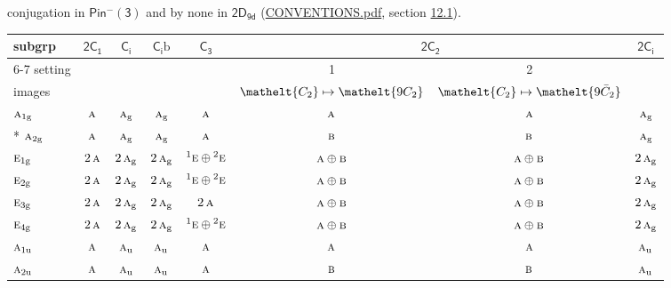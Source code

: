 \documentclass[10pt,a4paper]{article}
\numberwithin{equation}{section}
\newcommand{\eltfont}[1]{{\let\sigma\eltsigma\mathelt{#1}}}
\newcommand{\grp}[1]{\mathsf{#1}}
\newcommand{\irr}[1]{\text{\normalfont\scshape #1}}
\newcommand{\conjpair}[1]{{}^{#1}}
\newcommand{\cls}[1]{\eltfont{#1}}
\newcommand{\ptag}[1]{\mathrm{#1}}
\newcommand{\barred}[1]{\bar{#1}}
\newcommand{\secondclass}{\mathrm{b}}
\begin{document}
conjugation in \href{Pinminus3.pdf}{$\grp{Pin^{-}(3)}$} and by none in $\grp{2D_{9d}}$ (\href{../../CONVENTIONS.pdf}{CONVENTIONS.pdf}, section \href{../../../rotation/CONVENTIONS.pdf\#conv.12.1}{12.1}).
{\small\begin{longtable}{@{}lccccccc@{}}\toprule
subgrp & \href{2C1.pdf}{$\grp{2C_{1}}$} & \href{S2.pdf}{$\grp{C_{i}}$} & \href{S2b.pdf}{$\grp{C_{i}}\secondclass$} & \href{C3.pdf}{$\grp{C_{3}}$} & \multicolumn{2}{c}{\href{2C2.pdf}{$\grp{2C_{2}}$}} & \href{2S2.pdf}{$\grp{2C_{i}}$}\\\cmidrule(lr){6-7}
setting &  &  &  &  & 1 & 2 & \\
images &  &  &  &  & {\scriptsize $\cls{C_{2}} \mapsto \cls{9C_{2}}$} & {\scriptsize $\cls{C_{2}} \mapsto \cls{9\barred{C}_{2}}$} & \\\midrule\endhead
\bottomrule\endfoot\endlastfoot
$\irr{a}_{1\ptag{g}}$ & $\irr{a}$ & $\irr{a}_{\ptag{g}}$ & $\irr{a}_{\ptag{g}}$ & $\irr{a}$ & $\irr{a}$ & $\irr{a}$ & $\irr{a}_{\ptag{g}}$\\*
$\irr{a}_{2\ptag{g}}$ & $\irr{a}$ & $\irr{a}_{\ptag{g}}$ & $\irr{a}_{\ptag{g}}$ & $\irr{a}$ & $\irr{b}$ & $\irr{b}$ & $\irr{a}_{\ptag{g}}$\\
$\irr{e}_{1\ptag{g}}$ & $2\,\irr{a}$ & $2\,\irr{a}_{\ptag{g}}$ & $2\,\irr{a}_{\ptag{g}}$ & $\conjpair{1}\irr{e}\oplus \conjpair{2}\irr{e}$ & $\irr{a}\oplus \irr{b}$ & $\irr{a}\oplus \irr{b}$ & $2\,\irr{a}_{\ptag{g}}$\\
$\irr{e}_{2\ptag{g}}$ & $2\,\irr{a}$ & $2\,\irr{a}_{\ptag{g}}$ & $2\,\irr{a}_{\ptag{g}}$ & $\conjpair{1}\irr{e}\oplus \conjpair{2}\irr{e}$ & $\irr{a}\oplus \irr{b}$ & $\irr{a}\oplus \irr{b}$ & $2\,\irr{a}_{\ptag{g}}$\\
$\irr{e}_{3\ptag{g}}$ & $2\,\irr{a}$ & $2\,\irr{a}_{\ptag{g}}$ & $2\,\irr{a}_{\ptag{g}}$ & $2\,\irr{a}$ & $\irr{a}\oplus \irr{b}$ & $\irr{a}\oplus \irr{b}$ & $2\,\irr{a}_{\ptag{g}}$\\
$\irr{e}_{4\ptag{g}}$ & $2\,\irr{a}$ & $2\,\irr{a}_{\ptag{g}}$ & $2\,\irr{a}_{\ptag{g}}$ & $\conjpair{1}\irr{e}\oplus \conjpair{2}\irr{e}$ & $\irr{a}\oplus \irr{b}$ & $\irr{a}\oplus \irr{b}$ & $2\,\irr{a}_{\ptag{g}}$\\
$\irr{a}_{1\ptag{u}}$ & $\irr{a}$ & $\irr{a}_{\ptag{u}}$ & $\irr{a}_{\ptag{u}}$ & $\irr{a}$ & $\irr{a}$ & $\irr{a}$ & $\irr{a}_{\ptag{u}}$\\
$\irr{a}_{2\ptag{u}}$ & $\irr{a}$ & $\irr{a}_{\ptag{u}}$ & $\irr{a}_{\ptag{u}}$ & $\irr{a}$ & $\irr{b}$ & $\irr{b}$ & $\irr{a}_{\ptag{u}}$\\

\end{longtable}}
\end{document}
